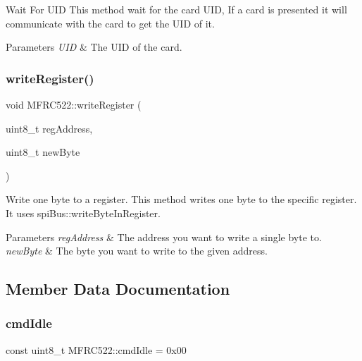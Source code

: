 Wait For U\+ID  This method wait for the card U\+ID, If a card is presented it will communicate with the card to get the U\+ID of it. 


\begin{DoxyParams}{Parameters}
{\em U\+ID} & The U\+ID of the card. \\
\hline
\end{DoxyParams}
\mbox{\label{classMFRC522_a4998d808c32388f57089b5b1f6affea5}} 
\subsubsection{\texorpdfstring{write\+Register()}{writeRegister()}}
{\footnotesize\ttfamily void M\+F\+R\+C522\+::write\+Register (\begin{DoxyParamCaption}\item[{uint8\+\_\+t}]{reg\+Address,  }\item[{uint8\+\_\+t}]{new\+Byte }\end{DoxyParamCaption})}



Write one byte to a register.  This method writes one byte to the specific register. It uses spi\+Bus\+::write\+Byte\+In\+Register. 


\begin{DoxyParams}{Parameters}
{\em reg\+Address} & The address you want to write a single byte to. \\
\hline
{\em new\+Byte} & The byte you want to write to the given address. \\
\hline
\end{DoxyParams}


\subsection{Member Data Documentation}
\mbox{\label{classMFRC522_aa0a33c3059b58a75fc8c1ff8201601bb}} 
\subsubsection{\texorpdfstring{cmd\+Idle}{cmdIdle}}
{\footnotesize\ttfamily const uint8\+\_\+t M\+F\+R\+C522\+::cmd\+Idle = 0x00\hspace{0.3cm}{\ttfamily [static]}}



